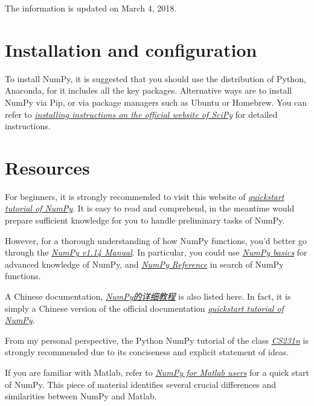 \documentclass[english]{../TeXTemplate/pkupaper}
\title{\titlemark}
\author{Yixuan Wang\quad ppppass}
\date{Update on March 4, 2018}
\begin{document}
\maketitle

The information is updated on March 4, 2018.

\section{Installation and configuration}

To install NumPy, it is suggested that you should use the distribution of Python, Anaconda, for it includes all the key packages. Alternative ways are to install NumPy via Pip, or via package managers such as Ubuntu or Homebrew. You can refer to \href{https://scipy.org/install.html}{\emph{installing instructions on the official website of SciPy}} for detailed instructions. 

\section{Resources}
For beginners, it is strongly recommended to visit this website of \href{https://docs.scipy.org/doc/numpy/user/quickstart.html}{\emph{quickstart tutorial of NumPy}}. It is easy to read and comprehend, in the meantime would prepare sufficient knowledge for you to handle preliminary tasks of NumPy.

However, for a thorough understanding of how NumPy functions, you'd better go through the \href{https://docs.scipy.org/doc/numpy/index.html}{\emph{NumPy v1.14 Manual}}. In particular, you could use \href{https://docs.scipy.org/doc/numpy/user/basics.html}{\emph{NumPy basics}} for advanced knowledge of NumPy, and \href{https://docs.scipy.org/doc/numpy/reference/index.html}{\emph{NumPy Reference}} in search of NumPy functions.

A Chinese documentation, \href{https://blog.csdn.net/chen_shiqiang/article/details/51868115}{\emph{NumPy的详细教程}} is also listed here. In fact, it is simply a Chinese version of the official documentation \href{https://docs.scipy.org/doc/numpy/user/quickstart.html}{\emph{quickstart tutorial of NumPy}}.

From my personal perspective, the Python NumPy tutorial of the class \href{https://cs231n.github.io/python-numpy-tutorial/}{\emph{CS231n}} is strongly recommended due to its conciseness and explicit statement of ideas.

If you are familiar with Matlab, refer to \href{https://docs.scipy.org/doc/numpy/user/numpy-for-matlab-users.html}{\emph{NumPy for Matlab users}} for a quick start of NumPy. This piece of material identifies several crucial differences and similarities between NumPy and Matlab.
\end{document}
